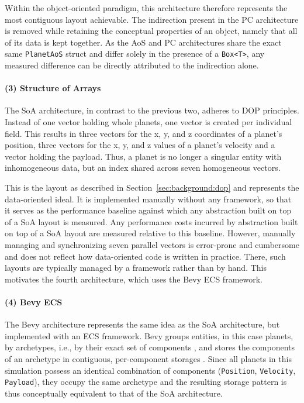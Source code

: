 Within the object-oriented paradigm, this architecture therefore represents the
most contiguous layout achievable. The indirection present in the \ac{PC} architecture is removed while retaining the conceptual properties of an object, namely that all of its data is kept together. As the \ac{AoS} and \ac{PC} architectures share the exact same \texttt{PlanetAoS} struct and differ solely in the presence of a \texttt{Box<T>}, any measured difference can be directly attributed to the indirection alone.

\paragraph{(3) Structure of Arrays}
The \ac{SoA} architecture, in contrast to the previous two, adheres to \ac{DOP} principles. Instead of one vector holding whole planets, one vector is created per individual field. This results in three vectors for the x, y, and z coordinates of a planet's position, three vectors for the x, y, and z values of a planet's velocity and a vector holding the payload. Thus, a planet is no longer a singular entity with inhomogeneous data, but an index shared across seven homogeneous vectors.

This is the layout as described in Section~\ref{sec:background:dop} and represents the data-oriented ideal. It is implemented manually without any framework, so that it serves as the performance baseline against which any abstraction built on top of a \ac{SoA} layout is measured. Any performance costs incurred by abstraction built on top of a \ac{SoA} layout are measured relative to this baseline. However, manually managing and synchronizing seven parallel vectors is error-prone and cumbersome and does not reflect how data-oriented code is written in practice. There, such layouts are typically managed by a framework rather than by hand. This motivates the fourth architecture, which uses the Bevy ECS framework.

\paragraph{(4) Bevy ECS}
The Bevy architecture represents the same idea as the \ac{SoA} architecture, but implemented with an ECS framework. Bevy groups entities, in this case planets, by archetypes, i.e., by their exact set of components \cite{redmond2025ecs}, and stores the components of an archetype in contiguous, per-component storages \cite{bevy_storage}. Since all planets in this simulation possess an identical combination of components (\texttt{Position}, \texttt{Velocity}, \texttt{Payload}), they occupy the same archetype and the resulting storage pattern is thus conceptually equivalent to that of the \ac{SoA} architecture.

